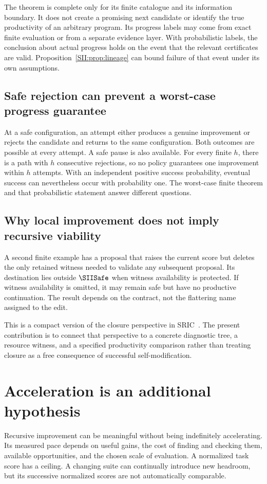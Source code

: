 The theorem is complete only for its finite catalogue and its information boundary. It does not create a promising next candidate or identify the true productivity of an arbitrary program. Its progress labels may come from exact finite evaluation or from a separate evidence layer. With probabilistic labels, the conclusion about actual progress holds on the event that the relevant certificates are valid. Proposition~\ref{SII:prop:lineage} can bound failure of that event under its own assumptions.

\subsection{Safe rejection can prevent a worst-case progress guarantee}
\begin{SIIcounterexample}\label{SII:ex:retry}
At a safe configuration, an attempt either produces a genuine improvement or rejects the candidate and returns to the same configuration. Both outcomes are possible at every attempt. A safe pause is also available. For every finite $h$, there is a path with $h$ consecutive rejections, so no policy guarantees one improvement within $h$ attempts. With an independent positive success probability, eventual success can nevertheless occur with probability one. The worst-case finite theorem and that probabilistic statement answer different questions.
\end{SIIcounterexample}

\subsection{Why local improvement does not imply recursive viability}
A second finite example has a proposal that raises the current score but deletes the only retained witness needed to validate any subsequent proposal. Its destination lies outside $\SIISafe$ when witness availability is protected. If witness availability is omitted, it may remain safe but have no productive continuation. The result depends on the contract, not the flattering name assigned to the edit.

This is a compact version of the closure perspective in SRIC~\cite{SII:sric}. The present contribution is to connect that perspective to a concrete diagnostic tree, a resource witness, and a specified productivity comparison rather than treating closure as a free consequence of successful self-modification.

\section{Acceleration is an additional hypothesis}\label{SII:sec:acceleration}
Recursive improvement can be meaningful without being indefinitely accelerating. Its measured pace depends on useful gains, the cost of finding and checking them, available opportunities, and the chosen scale of evaluation. A normalized task score has a ceiling. A changing suite can continually introduce new headroom, but its successive normalized scores are not automatically comparable.

